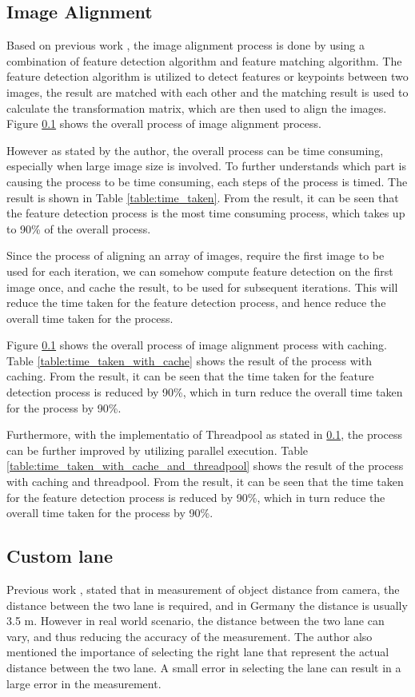 \subsection{Image Alignment}
Based on previous work \cite{Sabtu_2023}, the image alignment process is done by using a combination of feature detection algorithm and feature matching algorithm. The feature detection algorithm is utilized to detect features or keypoints between two images, the result are matched with each other and the matching result is used to calculate the transformation matrix, which are then used to align the images. Figure \ref{} shows the overall process of image alignment process.

However as stated by the author, the overall process can be time consuming, especially when large image size is involved. To further understands which part is causing the process to be time consuming, each steps of the process is timed. The result is shown in Table \ref{table:time_taken}. From the result, it can be seen that the feature detection process is the most time consuming process, which takes up to 90\% of the overall process.

Since the process of aligning an array of images, require the first image to be used for each iteration, we can somehow compute feature detection on the first image once, and cache the result, to be used for subsequent iterations. This will reduce the time taken for the feature detection process, and hence reduce the overall time taken for the process.

Figure \ref{} shows the overall process of image alignment process with caching.
Table \ref{table:time_taken_with_cache} shows the result of the process with caching. From the result, it can be seen that the time taken for the feature detection process is reduced by 90\%, which in turn reduce the overall time taken for the process by 90\%.

Furthermore, with the implementatio of Threadpool as stated in \ref{}, the process can be further improved by utilizing parallel execution. Table \ref{table:time_taken_with_cache_and_threadpool} shows the result of the process with caching and threadpool. From the result, it can be seen that the time taken for the feature detection process is reduced by 90\%, which in turn reduce the overall time taken for the process by 90\%.

\subsection{Custom lane}
\label{subsec:custom_lane}
Previous work \cite{Sabtu_2023}, stated that in measurement of object distance from camera, the distance between the two lane is required, and in Germany the distance is usually 3.5 m. However in real world scenario, the distance between the two lane can vary, and thus reducing the accuracy of the measurement. The author also mentioned the importance of selecting the right lane that represent the actual distance between the two lane. A small error in selecting the lane can result in a large error in the measurement.

